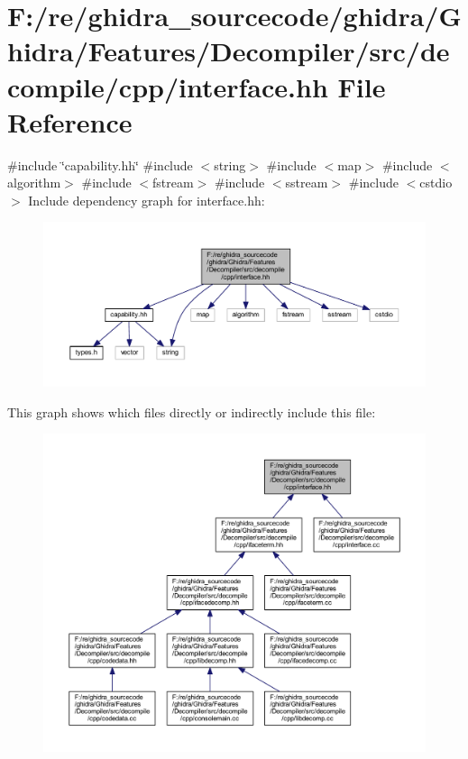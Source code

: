 \hypertarget{interface_8hh}{}\section{F\+:/re/ghidra\+\_\+sourcecode/ghidra/\+Ghidra/\+Features/\+Decompiler/src/decompile/cpp/interface.hh File Reference}
\label{interface_8hh}
{\ttfamily \#include \char`\"{}capability.\+hh\char`\"{}}\newline
{\ttfamily \#include $<$string$>$}\newline
{\ttfamily \#include $<$map$>$}\newline
{\ttfamily \#include $<$algorithm$>$}\newline
{\ttfamily \#include $<$fstream$>$}\newline
{\ttfamily \#include $<$sstream$>$}\newline
{\ttfamily \#include $<$cstdio$>$}\newline
Include dependency graph for interface.\+hh\+:
\nopagebreak
\begin{figure}[H]
\begin{center}
\leavevmode
\includegraphics[width=350pt]{interface_8hh__incl}
\end{center}
\end{figure}
This graph shows which files directly or indirectly include this file\+:
\nopagebreak
\begin{figure}[H]
\begin{center}
\leavevmode
\includegraphics[width=350pt]{interface_8hh__dep__incl}
\end{center}
\end{figure}

